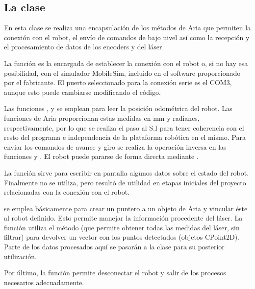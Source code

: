 \subsection{La clase } \label{CPioneer}
En esta clase se realiza una encapsulación de los métodos de Aria que permiten la conexión con el robot, el envío de comandos de bajo nivel así como la recepción y el procesamiento de datos de los encoders y del láser.

La función  es la encargada de establecer la conexión con el robot o, si no hay esa posibilidad, con el simulador MobileSim, incluido en el software proporcionado por el fabricante. El puerto seleccionado para la conexión serie es el COM3, aunque esto puede cambiarse modificando el código.

Las funciones ,  y  se emplean para leer la posición odométrica del robot. Las funciones de Aria proporcionan estas medidas en mm y radianes, respectivamente, por lo que se realiza el paso al S.I para tener coherencia con el resto del programa e independencia de la plataforma robótica en el mismo. Para enviar los comandos de avance y giro se realiza la operación inversa en las funciones  y . El robot puede pararse de forma directa mediante .

La función  sirve para escribir en pantalla algunos datos sobre el estado del robot. Finalmente no se utiliza, pero resultó de utilidad en etapas iniciales del proyecto relacionadas con la conexión con el robot.

 se emplea básicamente para crear un puntero a un objeto  de Aria y vincular éste al robot definido. Esto permite manejar la información procedente del láser. La función  utiliza el método  (que permite obtener todas las medidas del láser, sin filtrar) para devolver un vector con los puntos detectados (objetos CPoint2D). Parte de los datos procesados aquí se pasarán a la clase  para su posterior utilización.

Por último, la función  permite desconectar el robot y salir de los procesos necesarios adecuadamente.





